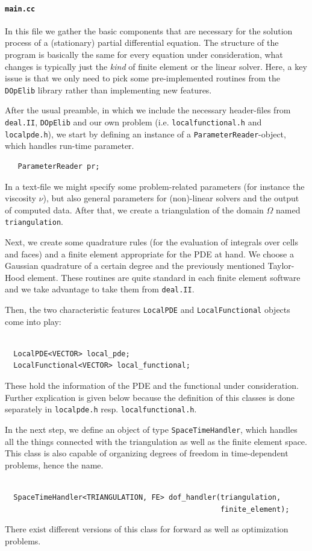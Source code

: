 \documentclass[prodmode,acmtoms]{acmsmall}
\numberwithin{equation}{section}
\newcommand{\deal}{\texttt{deal.II}}
\newcommand{\dope}{\texttt{DOpElib}}
\begin{document}
\paragraph{\texttt{main.cc}}
In this file we gather the basic components that are necessary for the
solution process of a (stationary) partial differential equation. The
structure of the program is basically the same for every equation under
consideration, what changes is typically just the \textit{kind} of  finite
element or the linear solver. Here, a key issue is that we only need to pick 
some pre-implemented routines from the \dope{} library rather than 
implementing new features.


After the usual preamble, in which we include the necessary header-files from \deal{}, \dope{} and our own problem (i.e. \texttt{localfunctional.h} and \texttt{localpde.h}), we start by defining an instance of a \texttt{ParameterReader}-object, which handles run-time parameter.
\begin{lstlisting}
   ParameterReader pr;
\end{lstlisting}
In a text-file we might specify some problem-related parameters (for instance the viscosity $\nu$), but also general parameters for (non)-linear solvers and the output of computed data. 
After that, we create a triangulation of the domain $\Omega$ named \texttt{triangulation}.

Next, we create some quadrature rules (for the evaluation of integrals over
cells and faces) and a finite element appropriate for the PDE at hand. We
choose a Gaussian quadrature of a certain degree and the previously mentioned
Taylor-Hood element. These routines are quite standard in each finite element
software and we take advantage to take them from \deal{}.

Then, the two characteristic features \texttt{LocalPDE} and \texttt{LocalFunctional} objects come into play:
\begin{lstlisting}
  
  LocalPDE<VECTOR> local_pde;
  LocalFunctional<VECTOR> local_functional;

\end{lstlisting}
These hold the information of the PDE and the functional under consideration. Further explication is given below because
the definition of this classes is done separately in \texttt{localpde.h} resp.   \texttt{localfunctional.h}.

In the next step, we define an object of type \texttt{SpaceTimeHandler}, which handles all the things connected with the triangulation as well as the finite element space. This class is also capable of organizing degrees of freedom in time-dependent problems, hence the name. 
\begin{lstlisting}

  SpaceTimeHandler<TRIANGULATION, FE> dof_handler(triangulation,
                                                  finite_element);

\end{lstlisting}
There exist different versions of this class for forward as well as optimization problems. 
\end{document}
